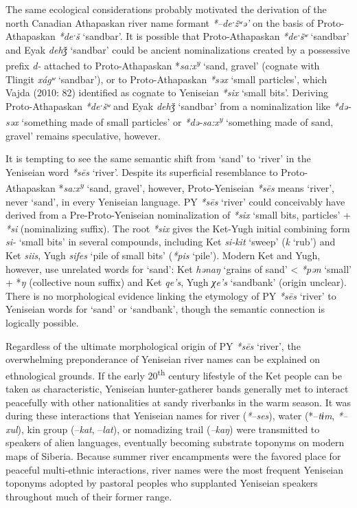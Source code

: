 The same ecological considerations probably motivated the derivation of the north Canadian Athapaskan river name formant \textit{*–deˑžʷə’} on the basis of Proto-Athapaskan \textit{*deˑš} ‘sandbar’. It is possible that Proto-Athapaskan \textit{*deˑšʷ} ‘sandbar’ and Eyak \textit{dehǯ }‘sandbar’ could be ancient nominalizations created by a possessive prefix \textit{d-} attached to Proto-Athapaskan *\textit{sa:x}\textit{\textsuperscript{y}} ‘sand, gravel’ (cognate with Tlingit \textit{xágʷ} ‘sandbar’), or to Proto-Athapaskan \textit{*səx} ‘small particles’, which Vajda (2010: 82) identified as cognate to Yeniseian \textit{*six} ‘small bits’. Deriving Proto-Athapaskan \textit{*deˑšʷ} and Eyak \textit{dehǯ }‘sandbar’ from a nominalization like \textit{*də-səx }‘something made of small particles’ or \textit{*də-sa:x}\textit{\textsuperscript{y}}\textsuperscript{ }‘something made of sand, gravel’ remains speculative, however.

It is tempting to see the same semantic shift from ‘sand’ to ‘river’ in the Yeniseian word \textit{*s\=es} ‘river’. Despite its superficial resemblance to Proto-Athapaskan *\textit{sa:x}\textit{\textsuperscript{y}} ‘sand, gravel’, however, Proto-Yeniseian \textit{*s\=es} means ‘river’, never ‘sand’, in every Yeniseian language. PY \textit{*s\=es} ‘river’ could conceivably have derived from a Pre-Proto-Yeniseian nominalization of \textit{*six} ‘small bits, particles’ + \textit{*si} (nominalizing suffix). The root \textit{*six} gives the Ket-Yugh initial combining form \textit{si- }‘small bits’ in several compounds, including\textit{ }Ket \textit{si-kit} ‘sweep’ (\textit{k\=\it} ‘rub’) and Ket \textit{siis}, Yugh \textit{sifes }‘pile of small bits’\textit{ }(\textit{*pis }‘pile’). Modern Ket and Yugh, however, use unrelated words for ‘sand’: Ket \textit{hənaŋ} ‘grains of sand’ {\textless} \textit{*pən} ‘small’ + *\textit{ŋ }(collective noun suffix) and Ket \textit{qe’s}, Yugh \textit{χe’s} ‘sandbank’ (origin unclear). There is no morphological evidence linking the etymology of PY \textit{*s\=es} ‘river’ to Yeniseian words for ‘sand’ or ‘sandbank’, though the semantic connection is logically possible.

Regardless of the ultimate morphological origin of PY \textit{*s\=es} ‘river’, the overwhelming preponderance of Yeniseian river names can be explained on ethnological grounds. If the early 20\textsuperscript{th} century lifestyle of the Ket people can be taken as characteristic, Yeniseian hunter-gatherer bands generally met to interact peacefully with other nationalities at sandy riverbanks in the warm season. It was during these interactions that Yeniseian names for river (\textit{*}–\textit{ses}), water (*–\textit{tɨm}, \textit{*–xul}), kin group (–\textit{kat}, –\textit{lat}), or nomadizing trail (\textit{–kaŋ}) were transmitted to speakers of alien languages, eventually becoming substrate toponyms on modern maps of Siberia. Because summer river encampments were the favored place for peaceful multi-ethnic interactions, river names were the most frequent Yeniseian toponyms adopted by pastoral peoples who supplanted Yeniseian speakers throughout much of their former range.

